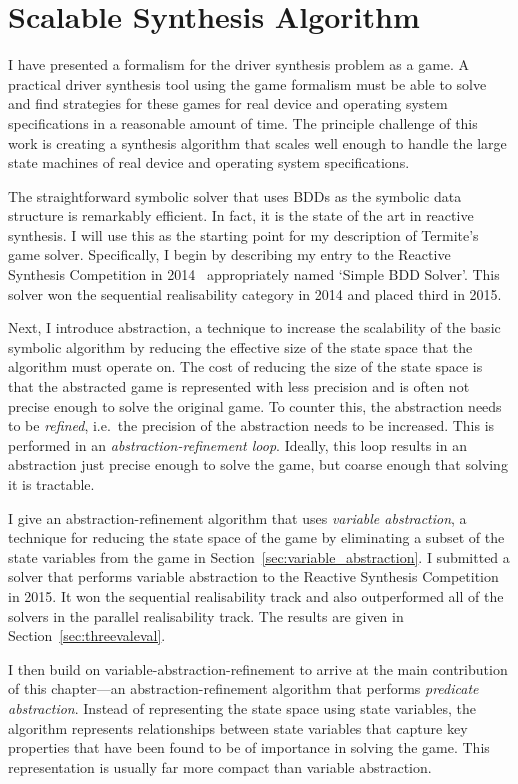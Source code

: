 \chapter{Scalable Synthesis Algorithm}
\label{ch:solving}

I have presented a formalism for the driver synthesis problem as a game. A practical driver synthesis tool using the game formalism must be able to solve and find strategies for these games for real device and operating system specifications in a reasonable amount of time. The principle challenge of this work is creating a synthesis algorithm that scales well enough to handle the large state machines of real device and operating system specifications. 

The straightforward symbolic solver that uses BDDs as the symbolic data structure is remarkably efficient. In fact, it is the state of the art in reactive synthesis. I will use this as the starting point for my description of Termite's game solver.  Specifically, I begin by describing my entry to the Reactive Synthesis Competition in 2014~\cite{syntcomp_arxiv} appropriately named `Simple BDD Solver'. This solver won the sequential realisability category in 2014 and placed third in 2015.

Next, I introduce abstraction, a technique to increase the scalability of the basic symbolic algorithm by reducing the effective size of the state space that the algorithm must operate on. The cost of reducing the size of the state space is that the abstracted game is represented with less precision and is often not precise enough to solve the original game. To counter this, the abstraction needs to be \emph{refined}, i.e.\ the precision of the abstraction needs to be increased. This is performed in an \emph{abstraction-refinement loop}. Ideally, this loop results in an abstraction just precise enough to solve the game, but coarse enough that solving it is tractable.

I give an abstraction-refinement algorithm that uses \emph{variable abstraction}, a technique for reducing the state space of the game by eliminating a subset of the state variables from the game in Section~\ref{sec:variable_abstraction}. I submitted a solver that performs variable abstraction to the Reactive Synthesis Competition in 2015. It won the sequential realisability track and also outperformed all of the solvers in the parallel realisability track. The results are given in Section~\ref{sec:threevaleval}.

I then build on variable-abstraction-refinement to arrive at the main contribution of this chapter---an abstraction-refinement algorithm that performs \emph{predicate abstraction}.  Instead of representing the state space using state variables, the algorithm represents relationships between state variables that capture key properties that have been found to be of importance in solving the game. This representation is usually far more compact than variable abstraction. 

